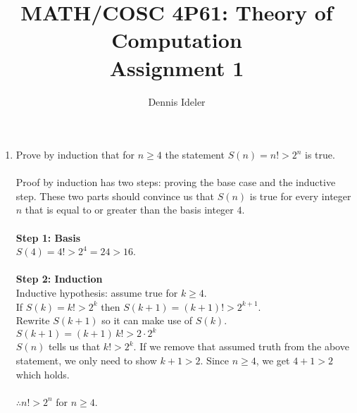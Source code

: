 \documentclass[10pt,a4paper,final]{article}
\author{Dennis Ideler}
\title{MATH/COSC 4P61: Theory of Computation\\Assignment 1}
\begin{document}
\maketitle

\begin{enumerate}
\item %
Prove by induction that for $n \geq 4$ the statement $S(n) = n! > 2^n$ is true.\\
\\
Proof by induction has two steps: proving the base case and the inductive step.
These two parts should convince us that $S(n)$ is true for every integer $n$
that is equal to or greater than the basis integer $4$.\\
\\
\textbf{Step 1: Basis}\\ %
$S(4) = 4! > 2^4 = 24 > 16$.\\
\\
\textbf{Step 2: Induction}\\
Inductive hypothesis: assume true for $k \geq 4$.\\
If $S(k) = k! > 2^k$ then $S(k+1) = (k+1)! > 2^{k+1}$.\\
Rewrite $S(k+1)$ so it can make use of $S(k)$.\\
$S(k+1) = (k+1)\,k! > 2 \cdot 2^k$\\
$S(n)$ tells us that $k! > 2^k$.
If we remove that assumed truth from the above statement, we only need to show $k+1 > 2$.
Since $n \geq 4$, we get $4 + 1 > 2$ which holds.\\
\\
$\therefore n! > 2^n$ for $n  \geq 4$.


\end{enumerate}
\end{document}
